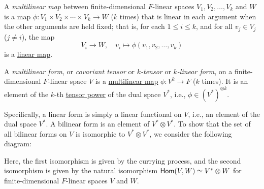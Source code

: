 \begin{definition}\label{def:multilinear_map}
	A \emph{multilinear map} between finite-dimensional $F$-linear spaces $V_1, V_2, \ldots, V_k$ and $W$ is a map $\phi \colon V_1 \times V_2 \times \cdots \times V_k \to W$ ($k$ times) that is linear in each argument when the other arguments are held fixed; that is, for each $1 \leq i \leq k$, and for all $v_j \in V_j$ ($j \neq i$), the map
	\[
		V_i \to W, \quad v_i \mapsto \phi(v_1, v_2, \ldots, v_k)
	\]
	is a \hyperref[def:linear_map]{linear map}.
\end{definition}

\begin{definition}\label{def:multilinear_form}
	A \emph{multilinear form}, or \emph{covariant tensor} or \emph{$k$-tensor} or \emph{$k$-linear form}, on a finite-dimensional $F$-linear space $V$ is a \hyperref[def:multilinear_map]{multilinear map} $\phi \colon V^k \to F$ ($k$ times). It is an element of the $k$-th \hyperref[def:tensor_power]{tensor power} of the dual space $V^*$, i.e., $\phi \in {(V^*)}^{\otimes k}$.
\end{definition}

Specifically, a linear form is simply a linear functional on $V$, i.e., an element of the dual space $V^*$. A bilinear form is an element of $V^* \otimes V^*$. To show that the set of all bilinear forms on $V$ is isomorphic to $V^* \otimes V^*$, we consider the following diagram:
\begin{center}
\end{center}
Here, the first isomorphism is given by the currying process, and the second isomorphism is given by the natural isomorphism $\operatorname{\text{\normalfont\sffamily Hom}}(V, W) \simeq V^* \otimes W$ for finite-dimensional $F$-linear spaces $V$ and $W$.


